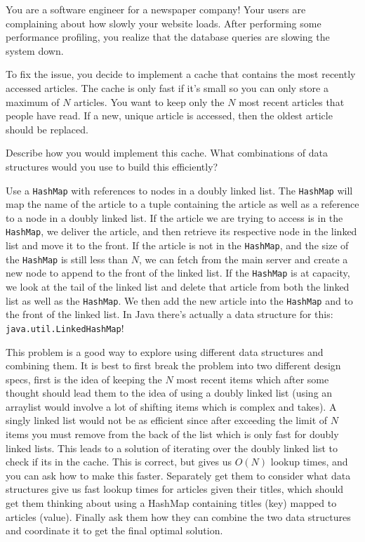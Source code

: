 \question You are a software engineer for a newspaper company! Your users are complaining about how slowly your website loads. After performing some performance profiling, you realize that the database queries are slowing the system down.

To fix the issue, you decide to implement a cache that contains the most recently accessed articles. The cache is only fast if it's small so you can only store a maximum of $N$ articles. You want to keep only the $N$ most recent articles that people have read. If a new, unique article is accessed, then the oldest article should be replaced.

Describe how you would implement this cache. What combinations of data structures would you use to build this efficiently? 

\begin{solution}[2in]
Use a \texttt{HashMap} with references to nodes in a doubly linked list. The \texttt{HashMap} will map the name of the article to a tuple containing the article as well as a reference to a node in a doubly linked list. If the article we are trying to access is in the \texttt{HashMap}, we deliver the article, and then retrieve its respective node in the linked list and move it to the front. If the article is not in the \texttt{HashMap}, and the size of the \texttt{HashMap} is still less than $N$, we can fetch from the main server and create a new node to append to the front of the linked list. If the \texttt{HashMap} is at capacity, we look at the tail of the linked list and delete that article from both the linked list as well as the \texttt{HashMap}. We then add the new article into the \texttt{HashMap} and to the front of the linked list. In Java there's actually a data structure for this: \texttt{java.util.LinkedHashMap}!

\begin{meta}
This problem is a good way to explore using different data structures and combining them. It is best to first break the problem into two different design specs, first is the idea of keeping the $N$ most recent items which after some thought should lead them to the idea of using a doubly linked list (using an arraylist would involve a lot of shifting items which is complex and takes). A singly linked list would not be as efficient since after exceeding the limit of $N$ items you must remove from the back of the list which is only fast for doubly linked lists.
This leads to a solution of iterating over the doubly linked list to check if its in the cache. This is correct, but gives us $O(N)$ lookup times, and you can ask how to make this faster. Separately get them to consider what data structures give us fast lookup times for articles given their titles, which should get them thinking about using a HashMap containing titles (key) mapped to articles (value).
Finally ask them how they can combine the two data structures and coordinate it to get the final optimal solution.
\end{meta}

\end{solution}